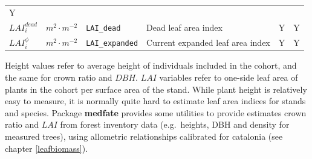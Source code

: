 \documentclass[]{book}
\begin{document}
\begin{longtable}[]{@{}llllll@{}}
\begin{minipage}[t]{0.07\columnwidth}
Y\strut
\end{minipage}\tabularnewline
\begin{minipage}[t]{0.10\columnwidth}\raggedright\strut
\(LAI^{dead}_i\)\strut
\end{minipage} & \begin{minipage}[t]{0.09\columnwidth}\raggedright\strut
\(m^2 \cdot m^{-2}\)\strut
\end{minipage} & \begin{minipage}[t]{0.06\columnwidth}\raggedright\strut
\texttt{LAI\_dead}\strut
\end{minipage} & \begin{minipage}[t]{0.43\columnwidth}\raggedright\strut
Dead leaf area index\strut
\end{minipage} & \begin{minipage}[t]{0.07\columnwidth}\raggedright\strut
Y\strut
\end{minipage} & \begin{minipage}[t]{0.07\columnwidth}\raggedright\strut
Y\strut
\end{minipage}\tabularnewline
\begin{minipage}[t]{0.10\columnwidth}\raggedright\strut
\(LAI^{\phi}_i\)\strut
\end{minipage} & \begin{minipage}[t]{0.09\columnwidth}\raggedright\strut
\(m^2 \cdot m^{-2}\)\strut
\end{minipage} & \begin{minipage}[t]{0.06\columnwidth}\raggedright\strut
\texttt{LAI\_expanded}\strut
\end{minipage} & \begin{minipage}[t]{0.43\columnwidth}\raggedright\strut
Current expanded leaf area index\strut
\end{minipage} & \begin{minipage}[t]{0.07\columnwidth}\raggedright\strut
Y\strut
\end{minipage} & \begin{minipage}[t]{0.07\columnwidth}\raggedright\strut
Y\strut
\end{minipage}\tabularnewline
\bottomrule
\end{longtable}

Height values refer to average height of individuals included in the
cohort, and the same for crown ratio and \(DBH\). \(LAI\) variables
refer to one-side leaf area of plants in the cohort per surface area of
the stand. While plant height is relatively easy to measure, it is
normally quite hard to estimate leaf area indices for stands and
species. Package \textbf{medfate} provides some utilities to provide
estimates crown ratio and \(LAI\) from forest inventory data
(e.g.~heights, DBH and density for measured trees), using allometric
relationships calibrated for catalonia (see chapter \ref{leafbiomass}).
\end{document}
